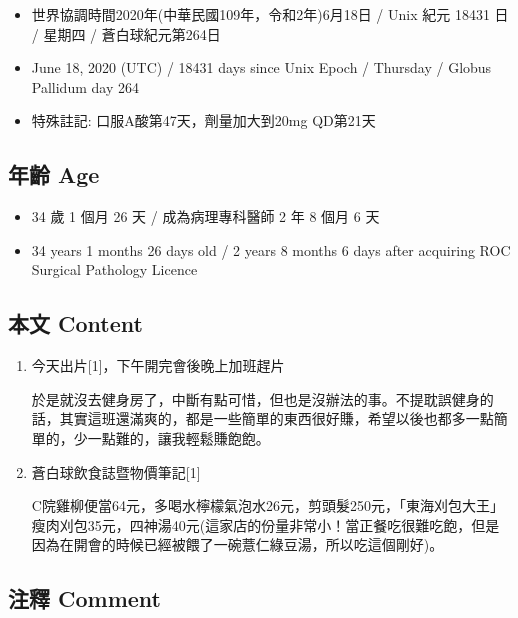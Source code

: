 \documentclass[a5paper, 11pt
]{book}
\providecommand{\tightlist}{%
  \setlength{\itemsep}{0pt}\setlength{\parskip}{0pt}}
\begin{document}
\begin{itemize}
\tightlist
\item
  世界協調時間2020年(中華民國109年，令和2年)6月18日 / Unix 紀元 18431 日
  / 星期四 / 蒼白球紀元第264日
\item
  June 18, 2020 (UTC) / 18431 days since Unix Epoch / Thursday / Globus
  Pallidum day 264
\item
  特殊註記: 口服A酸第47天，劑量加大到20mg QD第21天
\end{itemize}

\hypertarget{ux5e74ux9f61-age-17}{%
\subsection{年齡 Age}\label{ux5e74ux9f61-age-17}}

\begin{itemize}
\tightlist
\item
  34 歲 1 個月 26 天 / 成為病理專科醫師 2 年 8 個月 6 天
\item
  34 years 1 months 26 days old / 2 years 8 months 6 days after
  acquiring ROC Surgical Pathology Licence
\end{itemize}

\hypertarget{ux672cux6587-content-17}{%
\subsection{本文 Content}\label{ux672cux6587-content-17}}

\begin{enumerate}
\def\labelenumi{\arabic{enumi}.}
\item
  今天出片{[}1{]}，下午開完會後晚上加班趕片

  於是就沒去健身房了，中斷有點可惜，但也是沒辦法的事。不提耽誤健身的話，其實這班還滿爽的，都是一些簡單的東西很好賺，希望以後也都多一點簡單的，少一點難的，讓我輕鬆賺飽飽。
\item
  蒼白球飲食誌暨物價筆記{[}1{]}

  C院雞柳便當64元，多喝水檸檬氣泡水26元，剪頭髮250元，「東海刈包大王」瘦肉刈包35元，四神湯40元(這家店的份量非常小！當正餐吃很難吃飽，但是因為在開會的時候已經被餵了一碗薏仁綠豆湯，所以吃這個剛好)。
\end{enumerate}

\hypertarget{ux6ce8ux91cb-comment-17}{%
\subsection{注釋 Comment}\label{ux6ce8ux91cb-comment-17}}
\end{document}
